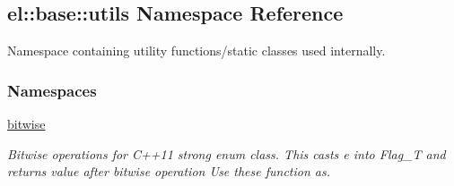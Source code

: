 \hypertarget{a00190}{}\subsection{el\+:\+:base\+:\+:utils Namespace Reference}
\label{a00190}


Namespace containing utility functions/static classes used internally.  


\subsubsection*{Namespaces}
\begin{DoxyCompactItemize}
\item 
 \hyperlink{a00191}{bitwise}
\begin{DoxyCompactList}\small\item\em Bitwise operations for C++11 strong enum class. This casts e into Flag\+\_\+\+T and returns value after bitwise operation Use these function as. \end{DoxyCompactList}\end{DoxyCompactItemize}
